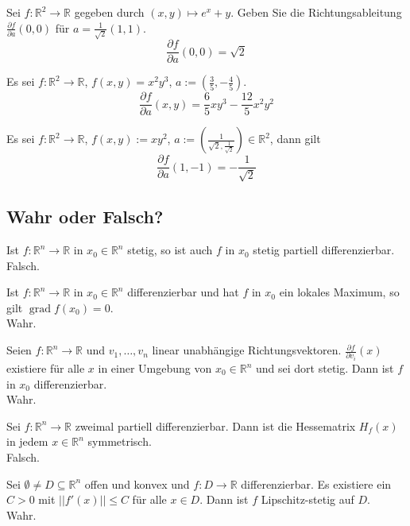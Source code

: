 \documentclass[parskip=full]{scrartcl}
\DeclareMathOperator{\grad}{grad}
\begin{document}
Sei $f : \mathbb{R}^2 \to \mathbb{R}$ gegeben durch $(x,y) \mapsto e^x + y$.
Geben Sie die Richtungsableitung $\frac{\partial f}{\partial a}(0,0)$ für $a = \frac{1}{\sqrt{2}} (1,1)$.
\begin{displaymath}
  \frac{\partial f}{\partial a} (0,0) = \sqrt{2}
\end{displaymath}

Es sei $f : \mathbb{R}^2 \to \mathbb{R}$, $f(x,y) = x^2y^3$, $a := \left(\frac{3}{5}, -\frac{4}{5}\right)$.
\begin{displaymath}
  \frac{\partial f}{\partial a}(x,y) = \frac{6}{5}xy^3 - \frac{12}{5}x^2y^2
\end{displaymath}

Es sei $f : \mathbb{R}^2 \to \mathbb{R}$, $f(x,y) := xy^2$, $a := \left(\frac{1}{\sqrt{2}, \frac{1}{\sqrt{2}}}\right) \in \mathbb{R}^2$, dann gilt
\begin{displaymath}
  \frac{\partial f}{\partial a}(1, -1) = -\frac{1}{\sqrt{2}}
\end{displaymath}

\subsection{Wahr oder Falsch?}
Ist $f : \mathbb{R}^n \to \mathbb{R}$ in $x_0 \in \mathbb{R}^n$ stetig, so ist auch $f$ in $x_0$ stetig partiell differenzierbar.\\
Falsch.

Ist $f : \mathbb{R}^n \to \mathbb{R}$ in $x_0 \in \mathbb{R}^n$ differenzierbar und hat $f$ in $x_0$ ein lokales Maximum, so gilt $\grad f(x_0) = 0$.\\
Wahr.

Seien $f : \mathbb{R}^n \to \mathbb{R}$ und $v_1, \dots, v_n$ linear unabhängige Richtungsvektoren.
$\frac{\partial f}{\partial v_i}(x)$ existiere für  alle $x$ in einer Umgebung von $x_0 \in \mathbb{R}^n$ und sei dort stetig.
Dann ist $f$ in $x_0$ differenzierbar.\\
Wahr.

Sei $f : \mathbb{R}^n \to \mathbb{R}$ zweimal partiell differenzierbar.
Dann ist die Hessematrix $H_f(x)$ in jedem $x \in \mathbb{R}^n$ symmetrisch.\\
Falsch.

Sei $\emptyset \neq D \subseteq \mathbb{R}^n$ offen und konvex und $f : D \to \mathbb{R}$ differenzierbar.
Es existiere ein $C > 0$ mit $|| f'(x) || \leq C$ für alle $x \in D$.
Dann ist $f$ Lipschitz-stetig auf $D$.\\
Wahr.
\end{document}
